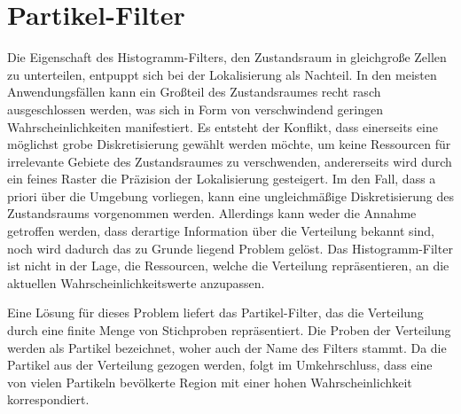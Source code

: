 \section{Partikel-Filter}
Die Eigenschaft des Histogramm-Filters, den Zustandsraum in gleichgroße Zellen zu unterteilen, entpuppt sich bei der Lokalisierung als Nachteil. In den meisten Anwendungsfällen kann ein Großteil des Zustandsraumes recht rasch ausgeschlossen werden, was sich in Form von verschwindend geringen Wahrscheinlichkeiten manifestiert. Es entsteht der Konflikt, dass einerseits eine möglichst grobe Diskretisierung gewählt werden möchte, um keine Ressourcen für irrelevante Gebiete des Zustandsraumes zu verschwenden, andererseits wird durch ein feines Raster die Präzision der Lokalisierung gesteigert. Im den Fall, dass a priori über die Umgebung vorliegen, kann eine ungleichmäßige Diskretisierung des Zustandsraums vorgenommen werden. Allerdings kann weder die Annahme getroffen werden, dass derartige Information über die Verteilung bekannt sind, noch wird dadurch das zu Grunde liegend Problem gelöst. Das Histogramm-Filter ist nicht in der Lage, die Ressourcen, welche die Verteilung repräsentieren, an die aktuellen Wahrscheinlichkeitswerte anzupassen. 

Eine Lösung für dieses Problem liefert das Partikel-Filter, das die Verteilung durch eine finite Menge von Stichproben repräsentiert. Die Proben der Verteilung werden als Partikel bezeichnet, woher auch der Name des Filters stammt. Da die Partikel aus der Verteilung gezogen werden, folgt im Umkehrschluss, dass eine von vielen Partikeln bevölkerte Region mit einer hohen Wahrscheinlichkeit korrespondiert.

